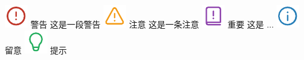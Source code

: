 











\newpage
\includegraphics[scale=0.5, trim=0 +5pt 0 0]{statics/icon/caution.pdf} {\color{colorCaution}\sffamily\scriptsize 警告} 
这是一段警告\newline
\includegraphics[scale=0.5, trim=0 +5pt 0 0]{statics/icon/warning.pdf} {\color{colorWarning}\sffamily\scriptsize 注意} 
这是一条注意\newline
\includegraphics[scale=0.5, trim=0 +5pt 0 0]{statics/icon/important.pdf} {\color{colorImportant}\sffamily\scriptsize 重要} 
这是 $\ldots$\newline
\includegraphics[scale=0.5, trim=0 +5pt 0 0]{statics/icon/note.pdf} {\color{colorNote}\sffamily\scriptsize 留意}
\newline
\includegraphics[scale=0.5, trim=0 +5pt 0 0]{statics/icon/tip.pdf} {\color{colorTip}\sffamily\scriptsize 提示}
\newline

